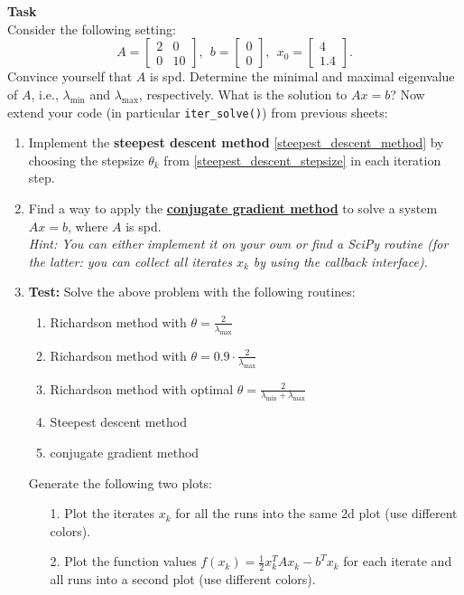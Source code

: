 ~\\~\\
\textbf{Task}\\
Consider the following setting: 
	$$A = 			\begin{bmatrix}
	2&0\\
	0&10
	\end{bmatrix}, ~~b = 			\begin{bmatrix}
	0\\
	0
	\end{bmatrix}, ~~x_0 = \begin{bmatrix}
	4\\
	1.4
	\end{bmatrix}.$$
Convince yourself that $A$ is spd. Determine the minimal and maximal eigenvalue of $A$, i.e., $\lambda_{\text{min}}$ and $\lambda_{\text{max}}$, respectively. What is the solution to $Ax=b$? Now extend your code (in particular \verb|iter_solve()|) from previous sheets:
	\begin{enumerate}
		\item Implement the \textbf{steepest descent method} \eqref{steepest_descent_method} by choosing the stepsize $\theta_k$ from \eqref{steepest_descent_stepsize} in each iteration step.
		\item Find a way to apply the \href{https://en.wikipedia.org/wiki/Conjugate_gradient_method#Example_code_in_MATLAB_/_GNU_Octave}{\textbf{conjugate gradient method}} to solve a system $Ax=b$, where $A$ is spd.\\
		\textit{Hint: You can either implement it on your own  or find a SciPy routine (for the latter: you can collect all iterates $x_k$ by using the callback interface).}
		\item \textbf{Test:} Solve the above problem with the following routines:
		\begin{enumerate}
			\item Richardson method with $\theta = \frac{2}{\lambda_{\text{max}}}$
			\item Richardson method with $\theta = 0.9 \cdot \frac{2}{\lambda_{\text{max}}}$
			\item Richardson method with optimal $\theta = \frac{2}{\lambda_{\text{min}}+\lambda_{\text{max}}}$
			\item Steepest descent method
			\item conjugate gradient method
		\end{enumerate}
		Generate the following two plots:
		\begin{itemize}
			\item[1.] Plot the iterates $x_k$ for all the runs into the same 2d plot (use different colors).
			\item[2.] Plot the function values $f(x_k) = \frac{1}{2} x_k^TAx_k - b^Tx_k$ for each iterate and all runs into a second plot (use different colors).
		\end{itemize}
	\end{enumerate}
